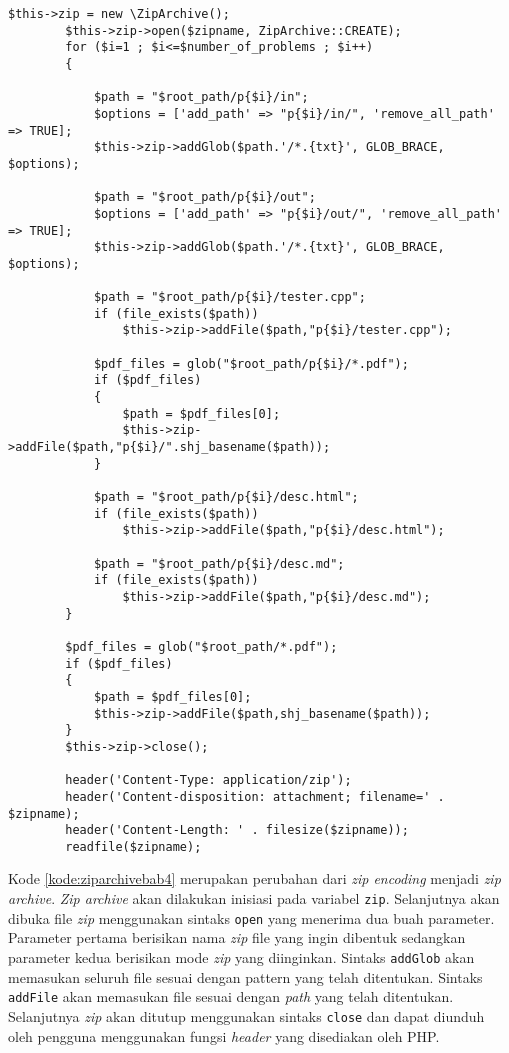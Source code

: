 \begin{lstlisting}[caption=Perancangan perubahan \textit{zip encoding} menjadi \textit{zip archive}, label=kode:ziparchivebab4]
$this->zip = new \ZipArchive();
		$this->zip->open($zipname, ZipArchive::CREATE);
		for ($i=1 ; $i<=$number_of_problems ; $i++)
		{

			$path = "$root_path/p{$i}/in";
			$options = ['add_path' => "p{$i}/in/", 'remove_all_path' => TRUE];
			$this->zip->addGlob($path.'/*.{txt}', GLOB_BRACE, $options);

			$path = "$root_path/p{$i}/out";
			$options = ['add_path' => "p{$i}/out/", 'remove_all_path' => TRUE];
			$this->zip->addGlob($path.'/*.{txt}', GLOB_BRACE, $options);

			$path = "$root_path/p{$i}/tester.cpp";
			if (file_exists($path))
				$this->zip->addFile($path,"p{$i}/tester.cpp");

			$pdf_files = glob("$root_path/p{$i}/*.pdf");
			if ($pdf_files)
			{
				$path = $pdf_files[0];
				$this->zip->addFile($path,"p{$i}/".shj_basename($path));
			}

			$path = "$root_path/p{$i}/desc.html";
			if (file_exists($path))
				$this->zip->addFile($path,"p{$i}/desc.html");

			$path = "$root_path/p{$i}/desc.md";
			if (file_exists($path))
				$this->zip->addFile($path,"p{$i}/desc.md");
		}

		$pdf_files = glob("$root_path/*.pdf");
		if ($pdf_files)
		{
			$path = $pdf_files[0];
			$this->zip->addFile($path,shj_basename($path));
		}
		$this->zip->close();
		
		header('Content-Type: application/zip');
		header('Content-disposition: attachment; filename=' . $zipname);
		header('Content-Length: ' . filesize($zipname));
		readfile($zipname);
\end{lstlisting}

Kode \ref{kode:ziparchivebab4} merupakan perubahan dari \textit{zip encoding} menjadi \textit{zip archive}. \textit{Zip archive} akan dilakukan inisiasi pada variabel \texttt{zip}. Selanjutnya akan dibuka file \textit{zip} menggunakan sintaks \texttt{open} yang menerima dua buah parameter. Parameter pertama berisikan nama \textit{zip} file yang ingin dibentuk sedangkan parameter kedua berisikan mode \textit{zip} yang diinginkan. Sintaks \texttt{addGlob} akan memasukan seluruh file sesuai dengan pattern yang telah ditentukan. Sintaks \texttt{addFile} akan memasukan file sesuai dengan \textit{path} yang telah ditentukan. Selanjutnya \textit{zip} akan ditutup menggunakan sintaks \texttt{close} dan dapat diunduh oleh pengguna menggunakan fungsi \textit{header} yang disediakan oleh PHP.


